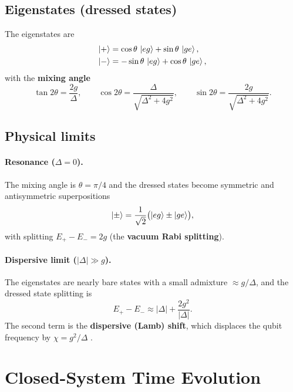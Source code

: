 \documentclass[12pt,a4paper]{article}
\newcommand{\D}{\Delta}
\begin{document}
\subsection{Eigenstates (dressed states)}

The eigenstates are
\begin{align}
  \ket{+} &= \cos\theta\,\ket{eg} + \sin\theta\,\ket{ge}, \label{eq:ep}\\
  \ket{-} &= -\sin\theta\,\ket{eg} + \cos\theta\,\ket{ge}, \label{eq:em}
\end{align}
with the \textbf{mixing angle}
\begin{equation}
  \tan 2\theta = \frac{2g}{\D},
  \qquad
  \cos 2\theta = \frac{\D}{\sqrt{\D^2+4g^2}},
  \qquad
  \sin 2\theta = \frac{2g}{\sqrt{\D^2+4g^2}}.
  \label{eq:mixing_angle}
\end{equation}

\subsection{Physical limits}

\paragraph{Resonance ($\D = 0$).}
The mixing angle is $\theta = \pi/4$ and the dressed states become
symmetric and antisymmetric superpositions
\begin{equation}
  \ket{\pm} = \frac{1}{\sqrt{2}}\bigl(\ket{eg} \pm \ket{ge}\bigr),
\end{equation}
with splitting $E_+ - E_- = 2g$ (the \textbf{vacuum Rabi splitting}).

\paragraph{Dispersive limit ($|\D| \gg g$).}
The eigenstates are nearly bare states with a small admixture $\approx g/\D$,
and the dressed state splitting is
\begin{equation}
  E_+ - E_- \approx |\D| + \frac{2g^2}{|\D|}.
\end{equation}
The second term is the \textbf{dispersive (Lamb) shift}, which displaces the
qubit frequency by $\chi = g^2/\D$ \cite{Blais2021}.

\section{Closed-System Time Evolution}
\end{document}
